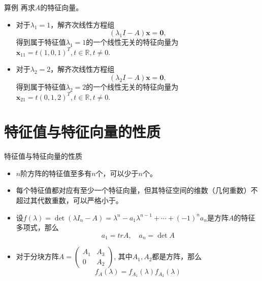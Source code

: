 \documentclass[10pt]{beamer}
\begin{document}

\begin{frame}

\begin{block}{算例}
再求$A$的特征向量。

\begin{itemize}
\item 对于$\lambda_1 = 1$，解齐次线性方程组
$$(\lambda_1 I-A)\mathbf{x} = \mathbf{0},$$
得到属于特征值$\lambda_1 = 1$的一个线性无关的特征向量为$\mathbf{x}_{11} = t(1,0,1)^T, t\in\mathbb{R}, t\neq 0$.
\item 对于$\lambda_2 = 2$，解齐次线性方程组
$$(\lambda_2 I-A)\mathbf{x} = \mathbf{0},$$
得到属于特征值$\lambda_2 = 2$的一个线性无关的特征向量为$\mathbf{x}_{21} = t(0,1,2)^T, t\in\mathbb{R}, t\neq 0$.
\end{itemize}
\end{block}

\end{frame}


\section{特征值与特征向量的性质}


\begin{frame}

\begin{block}{特征值与特征向量的性质}
\begin{itemize}
\item<1-> $n$阶方阵的特征值至多有$n$个，可以少于$n$个。
\item<2-> 每个特征值都对应有至少一个特征向量，但其特征空间的维数（几何重数）不超过其代数重数，可以严格小于。
\item<3-> 设$f(\lambda) = \det(\lambda I_n - A) = \lambda^n - a_1\lambda^{n-1} + \cdots + (-1)^na_n$是方阵$A$的特征多项式，那么
$$a_1 = tr A, \quad a_n = \det A$$
\item<4-> 对于分块方阵\(\displaystyle A = \begin{pmatrix} A_1 & A_3 \\ 0 & A_2 \end{pmatrix}\), 其中$A_1,A_2$都是方阵，那么
$$f_A(\lambda) = f_{A_1}(\lambda)f_{A_2}(\lambda)$$
\end{itemize}
\end{block}

\end{frame}
\end{document}
